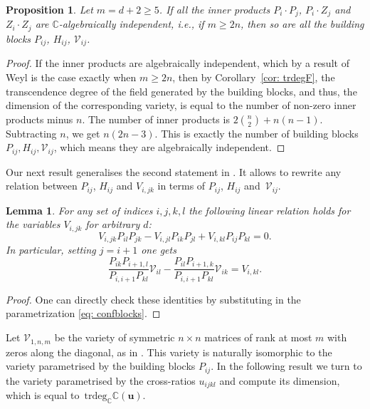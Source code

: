 \documentclass[12pt,a4paper]{extarticle}
\newtheorem{lemma}[theorem]{Lemma}
\newtheorem{proposition}[theorem]{Proposition}
\theoremstyle{definition}
\begin{document}
\begin{proposition}\label{prop:PHVrels}
    Let $m=d+2\ge 5$. If all the inner products $P_i\cdot P_j$, $P_i\cdot Z_j$ and $Z_i\cdot Z_j$ are $\mathbb{C}$-algebraically independent, i.e., if $m\geq 2n$, then so are all the building blocks $P_{ij}$, $H_{ij}$, $\mathcal{V}_{ij}$. 
\end{proposition}

\begin{proof}
    If the inner products are algebraically independent, which by a result of Weyl is the case exactly when $m\geq 2n$, then by Corollary~\ref{cor: trdegF}, the transcendence degree of the field generated by the building blocks, and thus, the dimension of the corresponding variety, is equal to the number of non-zero inner products minus $n$. 
    The number of inner products is $2\binom{n}{2}+n(n-1)$. Subtracting $n$, we get $n(2n-3)$. 
    This is exactly the number of building blocks $P_{ij}, H_{ij}, \mathcal{V}_{ij}$, which means they are algebraically independent.    
\end{proof}


Our next result generalises the second statement in \cite[Lemma 3.7]{MSS}.
It allows to rewrite any relation between $P_{ij}$, $H_{ij}$ and $V_{i,jk}$ in terms of $P_{ij}$, $H_{ij}$ and~$\mathcal{V}_{ij}$.

\begin{lemma} \label{lem:linrels_V}
For any set of indices $i,j,k,l$ the following linear relation holds for the variables $V_{i,jk}$ for arbitrary $d$: 
$$V_{i,jk}P_{il}P_{jk}-V_{i,jl}P_{ik}P_{jl}+V_{i,kl}P_{ij}P_{kl}=0.$$
In particular, setting $j=i+1$ one gets 
$$\dfrac{P_{ik}P_{i+1,l}}{P_{i,i+1}P_{kl}}\mathcal{V}_{il}-\dfrac{P_{il}P_{i+1,k}}{P_{i,i+1}P_{kl}}\mathcal{V}_{ik} = V_{i,kl}.$$    
\end{lemma}
\begin{proof}
   One can directly check these identities by substituting in the parametrization \eqref{eq: confblocks}.
\end{proof}

Let $\mathcal{V}_{1,n,m}$ be the variety of symmetric $n\times n$ matrices of rank at most $m$ with zeros along the diagonal, as in \cite[Section 2]{MSS}.
This variety is naturally isomorphic to the variety parametrised by the building blocks $P_{ij}$.
In the following result we turn to the variety parametrised by the cross-ratios $u_{ijkl}$ and compute its dimension, which is equal to~$\mathrm{trdeg}_{\mathbb{C}}\mathbb{C}(\mathbf{u})$.
\end{document}
